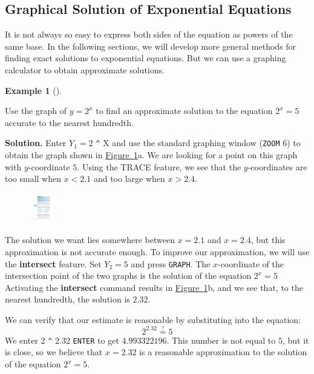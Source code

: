 \documentclass[10pt,]{book}
\newcommand{\terminology}[1]{\textbf{#1}}
\theoremstyle{plain}
\theoremstyle{definition}
\theoremstyle{definition}
\theoremstyle{definition}
\newtheorem{example}[theorem]{Example}
\theoremstyle{definition}
\theoremstyle{definition}
\numberwithin{equation}{section}
\newcommand{\lt}{ < }
\newcommand{\gt}{ > }
\begin{document}
\subsection[Graphical Solution of Exponential Equations]{Graphical Solution of Exponential Equations}\label{subsection-95}

	It is not always so easy to express both sides of the equation as powers of the same base. In the following sections, we will develop more general methods for finding exact solutions to exponential equations. But we can use a graphing calculator to obtain approximate solutions.
%
\begin{example}[]\label{example-gc-exponential-equation}

	Use the graph of \(y = 2^x\) to find an approximate solution to the equation \(2^x = 5\) accurate to the nearest hundredth.
%
\par\medskip\noindent%
\textbf{Solution.}\quad 
	Enter \(Y_1 = 2\) \lstinline?^? X and use the standard graphing window (\lstinline?ZOOM? 6) to obtain the graph shown in \hyperref[fig-GC-exponential-equation]{Figure~\ref{fig-GC-exponential-equation}}a. We are looking for a point on this graph with \(y\)-coordinate \(5\). Using the TRACE feature, we see that the \(y\)-coordinates are too small when \(x \lt 2.1\) and too large when \(x \gt 2.4\). 
%
\leavevmode%
\begin{figure}
\centering
\includegraphics[width=0.100\textwidth,]{images/fig-GC-exponential-equation.pdf}\caption{\label{fig-GC-exponential-equation}}
\end{figure}
\par

	The solution we want lies somewhere between \(x = 2.1\) and \(x = 2.4\), but this approximation is not accurate enough. To improve our approximation, we will use the \terminology{intersect} feature. Set \(Y_2 = 5\) and press \lstinline?GRAPH?. The \(x\)-coordinate of the intersection point of the two graphs is the solution of the equation \(2^x = 5\) Activating the \terminology{intersect} command results in \hyperref[fig-GC-exponential-equation]{Figure~\ref{fig-GC-exponential-equation}}b, and we see that, to the nearest hundredth, the solution is \(2.32\).
%
\par

	We can verify that our estimate is reasonable by substituting into the equation:
	\begin{equation*}2^{2.32}  \stackrel{?}{=} 5\end{equation*}
	We enter 2 \lstinline?^? 2.32 \lstinline?ENTER? to get \(4.993322196\). This number is not equal to \(5\), but it is close, so we believe that \(x = 2.32\) is a reasonable approximation to the solution of the equation \(2^x = 5\).
%
\end{example}
\end{document}
